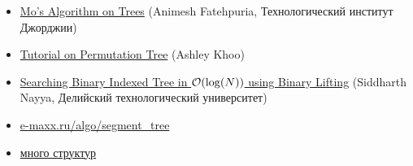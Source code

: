 \begin{itemize}
	\item \href{https://codeforces.com/blog/entry/43230}{Mo's Algorithm on Trees} (Animesh Fatehpuria, Технологический институт Джорджии)
	
	\item \href{https://codeforces.com/blog/entry/78898}{Tutorial on Permutation Tree} (Ashley Khoo)
	
	\item \href{https://codeforces.com/blog/entry/61364}{Searching Binary Indexed Tree in $ \mathcal{O}( \log(N))$ using Binary Lifting} (Siddharth Nayya, Делийский технологический университет)
	
	\item \href{https://e-maxx.ru/algo/segment_tree}{e-maxx.ru/algo/segment\_tree}
	
	\item \href{https://codeforces.com/blog/entry/15729}{много структур}
		
\end{itemize}

